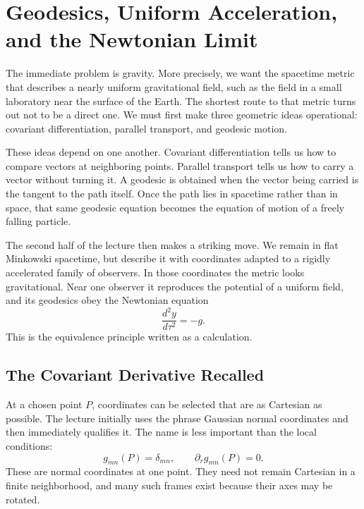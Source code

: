 \chapter{Geodesics, Uniform Acceleration, and the Newtonian Limit}

The immediate problem is gravity. More precisely, we want the spacetime metric that describes a nearly uniform gravitational field, such as the field in a small laboratory near the surface of the Earth. The shortest route to that metric turns out not to be a direct one. We must first make three geometric ideas operational: covariant differentiation, parallel transport, and geodesic motion.

These ideas depend on one another. Covariant differentiation tells us how to compare vectors at neighboring points. Parallel transport tells us how to carry a vector without turning it. A geodesic is obtained when the vector being carried is the tangent to the path itself. Once the path lies in spacetime rather than in space, that same geodesic equation becomes the equation of motion of a freely falling particle.

The second half of the lecture then makes a striking move. We remain in flat Minkowski spacetime, but describe it with coordinates adapted to a rigidly accelerated family of observers. In those coordinates the metric looks gravitational. Near one observer it reproduces the potential of a uniform field, and its geodesics obey the Newtonian equation
\begin{equation}
\frac{d^2y}{d\tau^2}=-g.
\end{equation}
This is the equivalence principle written as a calculation.

\section{The Covariant Derivative Recalled}

At a chosen point \(P\), coordinates can be selected that are as Cartesian as possible. The lecture initially uses the phrase Gaussian normal coordinates and then immediately qualifies it. The name is less important than the local conditions:
\begin{equation}
g_{mn}(P)=\delta_{mn},
\qquad
\partial_r g_{mn}(P)=0.
\label{eq:l4-normal-point}
\end{equation}
These are normal coordinates at one point. They need not remain Cartesian in a finite neighborhood, and many such frames exist because their axes may be rotated.

